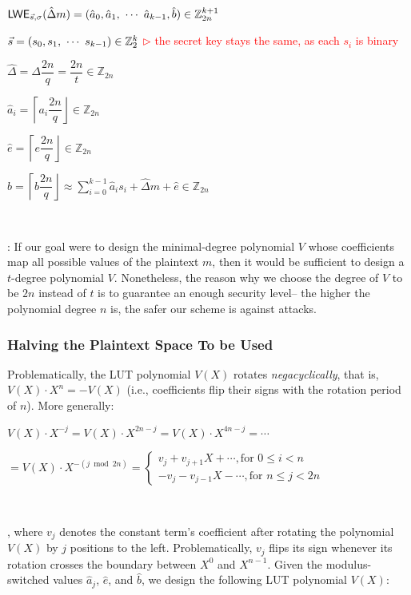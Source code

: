 $ $

$\textsf{LWE}_{\vec{s}, \sigma}(\hat{\Delta} m) = (\hat{a}_0, \hat{a}_1, \text{ } \text{$\cdots$} \text{ } \hat{a}_{k-1}, \hat{b}) \in \mathbb{Z}_{2n}^{k+1}$

$\vec{s} = (s_0, s_1, \text{ } \text{$\cdots$} \text{ } s_{k-1}) \in \mathbb{Z}_2^{k}$  \textcolor{red}{ $\rhd$ the secret key stays the same, as each $s_i$ is binary}

$\hat{\Delta} = \Delta\dfrac{2n}{q} = \dfrac{2n}{t} \in \mathbb{Z}_{2n}$

$\hat{a}_i = \left \lceil a_i\dfrac{2n}{q} \right \rfloor \in \mathbb{Z}_{2n}$

$\hat{e} = \left \lceil e\dfrac{2n}{q} \right \rfloor \in \mathbb{Z}_{2n}$

$\hat{b} = \left \lceil b\dfrac{2n}{q} \right \rfloor \approx \sum\limits_{i=0}^{k-1} \hat{a}_is_i + \hat{\Delta} m + \hat{e}  \in \mathbb{Z}_{2n}$



$ $

: If our goal were to design the minimal-degree polynomial $V$ whose coefficients map all possible values of the plaintext $m$, then it would be sufficient to design a ${t}$-degree polynomial $V$. Nonetheless, the reason why we choose the degree of $V$ to be $2n$ instead of ${t}$ is to guarantee an enough security level-- the higher the polynomial degree $n$ is, the safer our scheme is against attacks. 



\subsubsection{Halving the Plaintext Space To be Used}
\label{subsec:tfhe-zero-padding} 

Problematically, the LUT polynomial $V(X)$  rotates \textit{negacyclically}, that is, $V(X)\cdot X^{n} = -V(X)$ (i.e., coefficients flip their signs with the rotation period of $n$). More generally:


$V(X)\cdot X^{-j}= V(X)\cdot X^{2n - j} = V(X)\cdot X^{4n - j} = \cdots$


$
= V(X)\cdot X^{-(j \bmod 2n)} =  
\begin{cases}
    v_j  + v_{j+1}X + \cdots, \text{for } 0\leq i<n\\
    -v_{j} - v_{j-1}X - \cdots, \text{for } n\leq j<2n
\end{cases}
$

$ $

\noindent , where $v_j$ denotes the constant term's coefficient after rotating the polynomial $V(X)$ by $j$ positions to the left. Problematically, $v_j$ flips its sign whenever its rotation crosses the boundary between $X^0$ and $X^{n-1}$. Given the modulus-switched values $\hat{a}_j$, $\hat{e}$, and $\hat{b}$, we design the following LUT polynomial $V(X)$:

